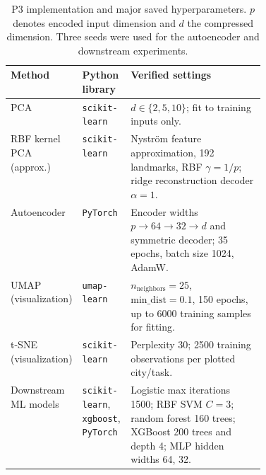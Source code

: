 \begin{table}[!htbp]\centering\scriptsize
\caption{P3 implementation and major saved hyperparameters. $p$ denotes encoded input dimension and $d$ the compressed dimension. Three seeds were used for the autoencoder and downstream experiments.}\label{tab:p3impl}
\begin{tabularx}{\linewidth}{@{}p{0.23\linewidth}p{0.19\linewidth}X@{}}\toprule
\textbf{Method} & \textbf{Python library} & \textbf{Verified settings}\\\midrule
PCA & \texttt{scikit-learn} & $d\in\{2,5,10\}$; fit to training inputs only.\\
RBF kernel PCA (approx.) & \texttt{scikit-learn} & Nystr\"om feature approximation, 192 landmarks, RBF $\gamma=1/p$; ridge reconstruction decoder $\alpha=1$.\\
Autoencoder & \texttt{PyTorch} & Encoder widths $p\to64\to32\to d$ and symmetric decoder; 35 epochs, batch size 1024, AdamW.\\
UMAP (visualization) & \texttt{umap-learn} & $n_{\mathrm{neighbors}}=25$, $\mathrm{min\_dist}=0.1$, 150 epochs, up to 6000 training samples for fitting.\\
t-SNE (visualization) & \texttt{scikit-learn} & Perplexity 30; 2500 training observations per plotted city/task.\\
Downstream ML models & \texttt{scikit-learn}, \texttt{xgboost}, \texttt{PyTorch} & Logistic max iterations 1500; RBF SVM $C=3$; random forest 160 trees; XGBoost 200 trees and depth 4; MLP hidden widths 64, 32.\\
\bottomrule\end{tabularx}
\end{table}
